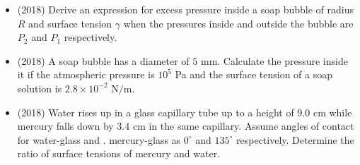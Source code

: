 \documentclass{article}
\begin{document}
\begin{itemize}
\item (2018)  Derive an expression for excess pressure inside a soap bubble of radius $ R$ and surface tension $ \gamma $ when the pressures inside and outside the bubble are $ P_{2}$ and $ P_{1}$ respectively. 
\item (2018)  A soap bubble has a diameter of $ 5$ mm. Calculate the pressure inside it if the atmospheric pressure is $ 10^{5}$ Pa and the surface tension of a soap solution is $ 2.8 \times 10^{-2}$ N$/$m.
\item (2018)  Water rises up in a glass capillary tube up to a height of $ 9.0$ cm while mercury falls down by $ 3.4$ cm in the same capillary. Assume angles of contact for water-glass and . mercury-glass as $ 0^{\circ}$ and $ 135^{\circ}$ respectively. Determine the ratio of surface tensions of mercury and water. 
\end{itemize}
\end{document}
